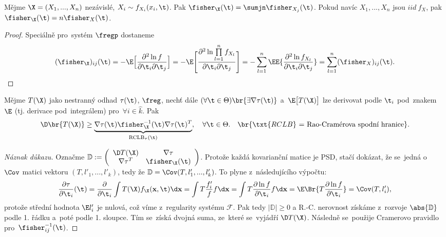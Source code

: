 \begin{lemma}
	Mějme $\X=(X_1,...,X_n)$ nezávislé, $X_i\sim f_{X_i}(x_i,\t)$. Pak $\fisher_\X(\t)=\sumjn \fisher_{X_j}(\t)$. Pokud navíc $X_1,...,X_n$ jsou $iid~f_X$, pak  $\fisher_\X(\t)=n\fisher_X(\t)$.
	\begin{proof}Speciálně pro~systém $\fregp$ dostaneme
	$$ (\fisher_\X)_{ij}(\t)=-\E\Big[ \frac{\partial^2 \ln f}{\partial\t_i\partial\t_j} \Big] =-\E\Bigg[ \frac{\partial^2 \ln \prod\limits_{l=1}^n f_{X_l}}{\partial\t_i\partial\t_j} \Bigg]=-\sum\limits_{l=1}^n\EE{\frac{\partial^2\ln f_{X_l}}{\partial\t_i\partial\t_j}}=\sum\limits_{l=1}^n(\fisher_X)_{ij}(\t).  $$
	\end{proof}
\end{lemma}
\begin{theorem}
	Mějme $T(\X)$ jako nestranný odhad $\tau(\t)$, $\freg$, nechť dále $(\forall\t\in\Theta)\br{\exists\nabla\tau(\t)}$ a~$\E\big[T(\X)\big]$ lze derivovat podle $\t_i$ pod~znakem $\E$ (tj. derivace pod~integrálem) pro~$\forall i\in\hat{k}$. Pak $$ \D\br{T(\X)}\geq \underbrace{\nabla\tau(\t)\fisher_\X^{-1}(\t)\nabla\tau(\t)^T}_{\mathrm{RCLB}_\tau(\t)},\quad \forall\t\in\Theta.\quad \br{\txt{RCLB}\text{ = Rao-Cramérova spodní hranice}}. $$
	\begin{proof}[Náznak důkazu]Označme $ \mathbb{D}:=\left(\begin{array}{cc}
		\D T(\X) & \nabla\tau \\ 
		\nabla\tau^T & \fisher_\X(\t)
		\end{array} \right)$.
	Protože každá kovarianční matice je PSD, stačí dokázat, že se~jedná o~$\Cov$ matici vektoru $(T,l'_1,...,l'_k)$, tedy že $\mathbb{D}=\Cov(T,l'_1,...,l'_k)$. To plyne z~následujícího výpočtu:
	$$\frac{\partial\tau}{\partial\t_i}(\t)=\frac{\partial}{\partial\t_i}\int T(\X)f_\X(\textbf{x},\t)\d \textbf{x}=\int T\frac{f'_i}{f}f\d \textbf{x}=\int T\frac{\partial\ln f}{\partial\t_i}f\d \textbf{x}= \E\Br{T\frac{\partial\ln f}{\partial\t_i}}=\Cov(T,l'_i),$$
	protože střední hodnota $\E l'_i$ je nulová, což víme z~regularity systému $\mathcal{F}$. Pak tedy
	$|\mathbb{D}|\geq0$ a	
	R.-C. nerovnost získáme z~rozvoje $\abs{\mathbb{D}}$ podle 1. řádku a~poté podle 1. sloupce. Tím se~získá dvojná suma, ze~které se~vyjádří $\D T(\X)$. Následně se~použije Cramerovo pravidlo pro~$\fisher_{ij}^{-1}(\t)$.
	\end{proof}
\end{theorem}
